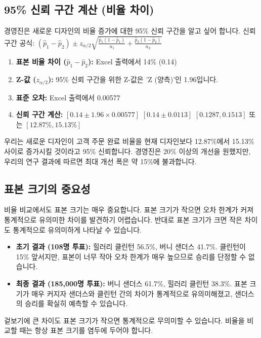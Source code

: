 \documentclass[11pt,a4paper]{article}
\theoremstyle{definition}
\begin{document}
\subsection{95\% 신뢰 구간 계산 (비율 차이)}
경영진은 새로운 디자인의 비율 증가에 대한 95\% 신뢰 구간을 알고 싶어 합니다.
신뢰 구간 공식: $(\hat{p}_1 - \hat{p}_2) \pm z_{\alpha/2} \sqrt{\frac{\hat{p}_1(1-\hat{p}_1)}{n_1} + \frac{\hat{p}_2(1-\hat{p}_2)}{n_2}}$

\begin{enumerate}
    \item \textbf{표본 비율 차이 ($\hat{p}_1 - \hat{p}_2$):}
    Excel 출력에서 14\% (0.14)
    \item \textbf{Z-값 ($z_{\alpha/2}$):}
    95\% 신뢰 구간을 위한 Z-값은 'Z (양측)'인 1.96입니다.
    \item \textbf{표준 오차:}
    Excel 출력에서 0.00577
    \item \textbf{신뢰 구간 계산:}
    $[0.14 \pm 1.96 \times 0.00577]$
    $[0.14 \pm 0.0113]$
    $[0.1287, 0.1513]$ 또는 $[12.87\%, 15.13\%]$
\end{enumerate}

\begin{summarybox}[title=95\% 신뢰 구간 해석]
우리는 새로운 디자인이 고객 주문 완료 비율을 현재 디자인보다 12.87\%에서 15.13\% 사이로 증가시킬 것이라고 95\% 신뢰합니다. 경영진은 20\% 이상의 개선을 원했지만, 우리의 연구 결과에 따르면 최대 개선 폭은 약 15\%에 불과합니다.
\end{summarybox}

\subsection{표본 크기의 중요성}
비율 비교에서도 표본 크기는 매우 중요합니다. 표본 크기가 작으면 오차 한계가 커져 통계적으로 유의미한 차이를 발견하기 어렵습니다. 반대로 표본 크기가 크면 작은 차이도 통계적으로 유의미하게 나타날 수 있습니다.

\begin{examplebox}[title=정치 여론조사 사례:]
\begin{itemize}
    \item \textbf{초기 결과 (108명 투표):} 힐러리 클린턴 56.5\%, 버니 샌더스 41.7\%. 클린턴이 15\% 앞서지만, 표본이 너무 작아 오차 한계가 매우 높으므로 승리를 단정할 수 없습니다.
    \item \textbf{최종 결과 (185,000명 투표):} 버니 샌더스 61.7\%, 힐러리 클린턴 38.3\%. 표본 크기가 매우 커지자 샌더스와 클린턴 간의 차이가 통계적으로 유의미해졌고, 샌더스의 승리를 확실히 예측할 수 있습니다.
\end{itemize}
겉보기에 큰 차이도 표본 크기가 작으면 통계적으로 무의미할 수 있습니다. 비율을 비교할 때는 항상 표본 크기를 염두에 두어야 합니다.
\end{examplebox}
\end{document}
